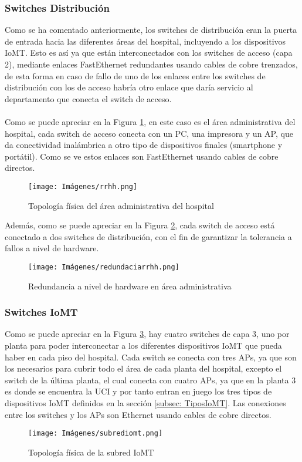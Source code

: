 \subsubsection{Switches Distribución}
Como se ha comentado anteriormente, los switches de distribución eran la puerta de entrada hacia las diferentes áreas del hospital, incluyendo a los dispositivos IoMT. Esto es así 
ya que están interconectados con los switches de acceso (capa 2), mediante enlaces FastEthernet redundantes usando cables de cobre trenzados, de esta forma en caso de fallo de uno de los enlaces 
entre los switches de distribución con los de acceso habría otro enlace que daría servicio al departamento que conecta el switch de acceso.
\\ \\
Como se puede apreciar en la Figura \ref{fig:RRHH}, en este caso es el área administrativa del hospital, cada switch de acceso conecta con un PC, una impresora y un AP, que da conectividad inalámbrica a otro tipo de dispositivos finales (smartphone y portátil).
Como se ve estos enlaces son FastEthernet usando cables de cobre directos.
\begin{figure}[H]
    \centering
    \texttt{[image: Imágenes/rrhh.png]}
    \caption{Topología física del área administrativa del hospital}
    \label{fig:RRHH} 
\end{figure}
Además, como se puede apreciar en la Figura \ref{fig:redundaciaARe}, cada switch de acceso está conectado a dos switches de distribución, con el fin de garantizar la tolerancia a fallos a nivel de hardware.
\begin{figure}[H]
    \centering
    \texttt{[image: Imágenes/redundaciarrhh.png]}
    \caption{Redundancia a nivel de hardware en área administrativa}
    \label{fig:redundaciaARe} 
\end{figure}

\subsubsection{Switches IoMT}
Como se puede apreciar en la Figura \ref{fig:iomt}, hay cuatro switches de capa 3, uno por planta para poder interconectar a los diferentes dispositivos IoMT que pueda haber en cada piso del hospital. Cada switch se conecta con 
tres APs, ya que son los necesarios para cubrir todo el área de cada planta del hospital, excepto el switch de la última planta, el cual conecta con cuatro APs, ya que en la planta 3 es donde se encuentra la UCI y por tanto 
entran en juego los tres tipos de dispositivos IoMT definidos en la sección \ref{subsec: TiposIoMT}.
Las conexiones entre los switches y los APs son Ethernet usando cables de cobre directos.
\begin{figure}[H]
    \centering
    \texttt{[image: Imágenes/subrediomt.png]}
    \caption{Topología física de la subred IoMT}
    \label{fig:iomt} 
\end{figure}

